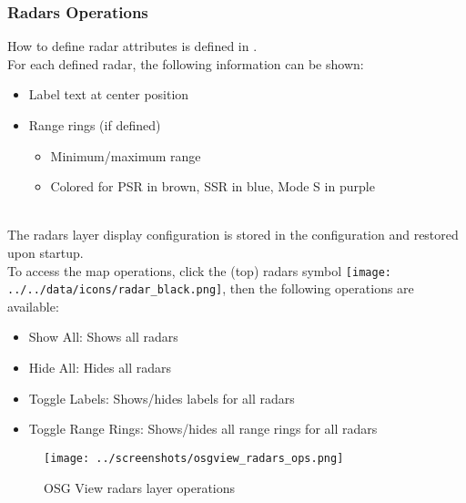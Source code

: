 \subsubsection{Radars Operations}
\label{sec:osg_radars_ops} 

How to define radar attributes is defined in . \\

For each defined radar, the following information can be shown:

\begin{itemize}
 \item Label text at center position
 \item Range rings (if defined)
\begin{itemize}
 \item Minimum/maximum range
 \item Colored for PSR in brown, SSR in blue, Mode S in purple
\end{itemize} 
\end{itemize} 
\ \\

The radars layer display configuration is stored in the configuration and restored upon startup. \\

To access the map operations, click the (top) radars symbol \texttt{[image: ../../data/icons/radar\_black.png]}, then the following operations are available:

\begin{itemize}
 \item Show All: Shows all radars
 \item Hide All: Hides all radars
 \item Toggle Labels: Shows/hides labels for all radars
 \item Toggle Range Rings: Shows/hides all range rings for all radars
\end{itemize} 

\begin{figure}[H]
    \texttt{[image: ../screenshots/osgview\_radars\_ops.png]}
  \caption{OSG View radars layer operations}
\end{figure}
